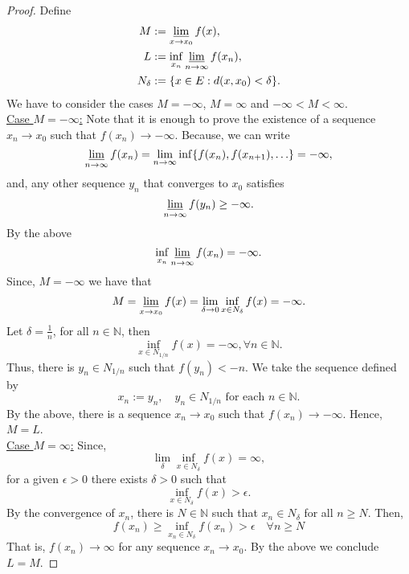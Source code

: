     \begin{proof}
        Define 
        \begin{align*}
            M &:= \varliminf_{x \to x_0} f(x),  \\
            L &:= \inf_{x_n}{\varliminf_{n \to \infty} f(x_n)}, \\
            N_{\delta} &:= \{ x \in E : d(x, x_0) < \delta \}.
        \end{align*}
        We have to consider the cases $M = - \infty$, $M = \infty$ and 
        $ -\infty < M < \infty $. \\
        \underline{Case $M = -\infty$:}
        Note that it is enough to prove the 
        existence of a sequence $x_n \to x_0$ such that $f(x_n) \to - \infty$. 
        Because, we can write
        $$
            \varliminf_{n \to \infty}{f(x_n)} = \lim_{n \to \infty} %
            \inf \{ f(x_n), f(x_{n+1}), \ldots \} = - \infty,
        $$
        and, any other sequence $y_n$ that converges to $x_0$ satisfies
        $$
            \varliminf_{n \to \infty}f(y_n) \geq - \infty.
        $$
        By  the above 
        $$
            \inf_{x_n} \varliminf_{n \to \infty} f(x_n) = -\infty.
        $$
        Since, $M = -\infty$ we have that
        $$
            M = \varliminf_{x \to x_0} f(x) = \lim_{\delta \to 0} %
            \inf_{x \in N_{\delta}} f(x) = - \infty .
        $$
        Let $\delta = \frac{1}{n}$, for all $n \in \mathbb{N}$, then
        $$
            \inf_{x \in N_{1/n}} f(x) = -\infty, \forall n \in \mathbb{N}.
        $$
        Thus, there is $y_n \in N_{1/n}$ such that $f(y_n) < -n$. We take the 
        sequence defined by 
        $$
            x_n := y_n, \quad y_n \in  N_{1/n} \text{ for each } n \in 
            \mathbb{N}.
        $$
        By the above, there is a sequence $x_n \to x_0$ such that 
        $f(x_n) \to - \infty$. Hence, $M = L$. \\
        \underline{Case $M = \infty$:} Since,
        $$
            \lim_{\delta} \inf_{x \in N_{\delta}} f(x) = \infty, 
        $$
        for a given $\epsilon > 0 $ there exists $\delta > 0 $ such that 
        $$
            \inf_{x \in N_{\delta}} f(x) > \epsilon.
        $$
        By the convergence of $x_n$, there is $N \in \mathbb{N}$ such that 
        $x_n \in N_{\delta}$ for all $n \geq N$. Then, 
        $$
            f(x_n) \geq \inf_{x_n \in N_{\delta}} f(x_n) > %
            \epsilon \quad \forall n \geq N
        $$ 
        That is, $f(x_n) \to \infty$ for any sequence $x_n \to x_0$. By the 
        above
        we conclude $L = M$.

\end{proof}
